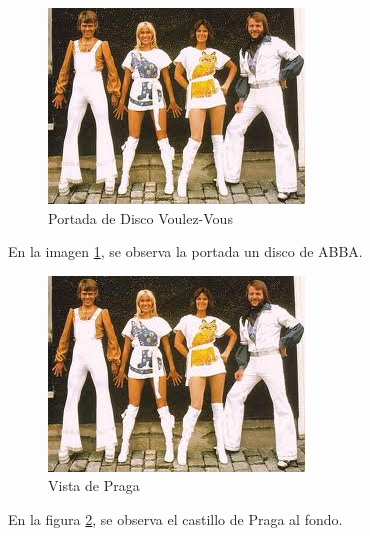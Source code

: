\documentclass[12pt]{book}
\begin{document}
\begin{figure} 
\begin{center}
\includegraphics{ABBA.jpg}
	\end{center}
\caption{Portada de Disco Voulez-Vous}	
\label{Figura_ABBA} 
\end{figure}
En la imagen \ref{Figura_ABBA}, se observa 
la portada un disco de ABBA. 
\begin{figure} 
\begin{center}
\includegraphics[scale=0.8]{Praga.jpg} 
\end{center} \caption{Vista de Praga}	
\label{Figura_Praga} 
\end{figure}
En la figura \ref{Figura_Praga}, se observa 
el castillo de Praga al fondo. 
\end{document}
